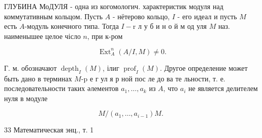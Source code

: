 \documentclass[10pt]{article}
\begin{document}
ГЛУБИНА МоДУЛЯ - одна из когомологич. характеристик модуля над коммутативным кольцом. Пусть $A$ - нётерово кольцо, $I$ - его идеал и пусть $M$ есть $A$-модуль конечного типа. Тогда $I-\mathrm{r}$ л у б и н о й м од уля $M$ наз. наименышее целое чісло $n$, при к-ром



\[

\operatorname{Ext}_{A}^{n}(A / I, M) \neq 0 .

\]



Г. м. обозначают $\operatorname{depth}_{I}(M)$, ілиг $\operatorname{prof}_{I}(M)$. Другое определение может быть дано в терминах $M$-p е г ул я р ной пос ле до ва те льности, т. е. последовательности таких әлементов $a_{1}, \ldots, a_{k}$ из $A$, что $a_{i}$ не является делителем нуля в модуле



\[

M /\left(a_{1}, \ldots, a_{i-1}\right) M \text {. }

\]



33 Математическая энц., т. 1
\end{document}

